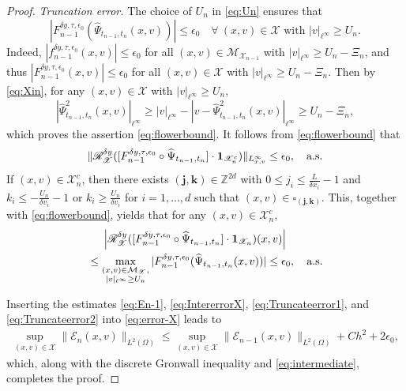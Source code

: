 \documentclass[11pt,reqno]{amsproc}
\numberwithin{equation}{section}
\begin{document}
\begin{proof}
\textit{Truncation error.}
The choice of $U_n$ in \eqref{eq:Un} ensures that
\begin{equation}\label{eq:flowerbound}
 |F_{n-1}^{\delta y,\tau,\epsilon_0}(\widehat{\Psi}_{t_{n-1},t_{n}}(x,v))|\le\epsilon_0 \quad 
 \forall~(x,v)\in\mathscr{X}\text{ with } |v|_{\ell^\infty}\ge U_{n}.
\end{equation}
Indeed, $|f_{n-1}^{\delta y,\tau,\epsilon_0}(x,v)|\le \epsilon_0$ for all $(x,v)\in\mathcal{M}_{\mathscr{X}_{n-1}}$ with $|v|_{\ell^\infty}\ge U_{n}-\Xi_n$, and thus 
$|F_{n-1}^{\delta y,\tau,\epsilon_0}(x,v)|\le \epsilon_0$
for all $(x,v)\in\mathscr{X}$ with $|v|_{\ell^\infty}\ge U_{n}-\Xi_n$.
Then by \eqref{eq:Xin}, for any $(x,v)\in\mathscr{X}$ with $|v|_{\ell^\infty}\ge U_{n}$, 
$$|\widehat{\Psi}^2_{t_{n-1},t_{n}}(x,v)|_{\ell^\infty}\ge |v|_{\ell^\infty}-|v-\widehat{\Psi}^2_{t_{n-1},t_{n}}(x,v)|_{\ell^\infty}\ge U_n-\Xi_n,$$
which proves the assertion \eqref{eq:flowerbound}. It follows from \eqref{eq:flowerbound} that
\begin{equation}\label{eq:Truncateerror1}
\|\mathscr{R}_{\mathscr{X}}^{\delta y}([F^{\delta y,\tau,\epsilon_0}_{n-1}\circ\widehat{\Psi}_{t_{n-1},t_{n}}]\cdot\mathbf{1}_{\mathscr{X}_n^c})\|_{L_{x,v}^\infty}\le \epsilon_0,\quad \textup{a.s.}
\end{equation}
If $(x,v)\in\mathscr{X}_n^c$, then there exists $(\mathbf{j},\mathbf{k})\in \mathbb{Z}^{2d}$ with
$0\le j_i\le \frac{L}{\delta x_i}-1$ and $k_i\le - \frac{U_n}{\delta v_i}-1$ or $k_i\ge\frac{U_n}{\delta v_i}$ for $i=1,\ldots,d$ 
such that $(x,v)\in\square_{(\mathbf{j},\mathbf{k})}.$ This, together with \eqref{eq:flowerbound}, yields that for any $(x,v)\in\mathscr{X}_n^c$, 
\begin{align}\label{eq:Truncateerror2}
&\quad\ \left|\mathscr{R}_{\mathscr{X}}^{\delta y}([F^{\delta y,\tau,\epsilon_0}_{n-1}\circ\widehat{\Psi}_{t_{n-1},t_{n}}]\cdot\mathbf{1}_{\mathscr{X}_n})(x,v)\right|\\\notag
&\le \max_{\substack{(x,v)\in\mathcal{M}_{\mathscr{X}},\\|v|_{\ell^\infty}\ge U_n}}|F^{\delta y,\tau,\epsilon_0}_{n-1}(\widehat{\Psi}_{t_{n-1},t_{n}}(x,v))|\le \epsilon_0,\quad \textup{a.s.}
\end{align}

Inserting the estimates \eqref{eq:En-1}, \eqref{eq:IntererrorX}, \eqref{eq:Truncateerror1}, and \eqref{eq:Truncateerror2} into \eqref{eq:error-X} leads to
\begin{align*}
\sup_{(x,v)\in\mathscr{X}}\|\mathcal{E}_{n}(x,v)\|_{L^2(\Omega)}\le \sup_{(x,v)\in\mathscr{X}}\|\mathcal{E}_{n-1}(x,v)\|_{L^2(\Omega)}+Ch^2+2\epsilon_0,
\end{align*}
which, along with the discrete Gronwall inequality and \eqref{eq:intermediate}, completes the proof.
\end{proof}
\end{document}
